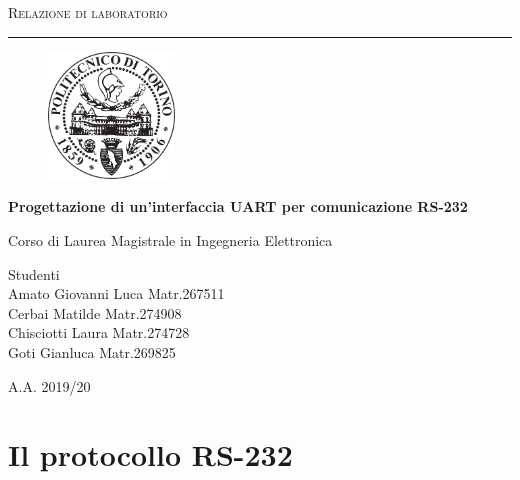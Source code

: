 \documentclass[a4paper, titlepage]{article}
\begin{document}
\begin{titlepage}
	\centering
	{\scshape\Large Relazione di laboratorio\par}
	\vspace{0.7 cm}
	\hrule
	\vspace{1.2 cm}
	\begin{figure}[!h]
	    \centering
	    \includegraphics[width=0.30\textwidth]{Politecnico_di_Torino_-_Logo}
	\end{figure}
	
		\vspace{1 cm}
	{\huge\bfseries Progettazione di un'interfaccia  UART per comunicazione  RS-232\par}
	
	\vspace{2 cm}
	Corso di Laurea Magistrale in Ingegneria Elettronica\par
	\null
	\vfill
	{\raggedright\small Studenti\\\large  Amato Giovanni Luca Matr.267511	\\Cerbai Matilde Matr.274908 \\Chisciotti Laura Matr.274728\\Goti Gianluca Matr.269825\par}
	\vspace{0.2 cm}

	\vfill
	{\large A.A. 2019/20}
\end{titlepage}
\newpage
\tableofcontents
\newpage
\section{Il protocollo RS-232}
\end{document}
